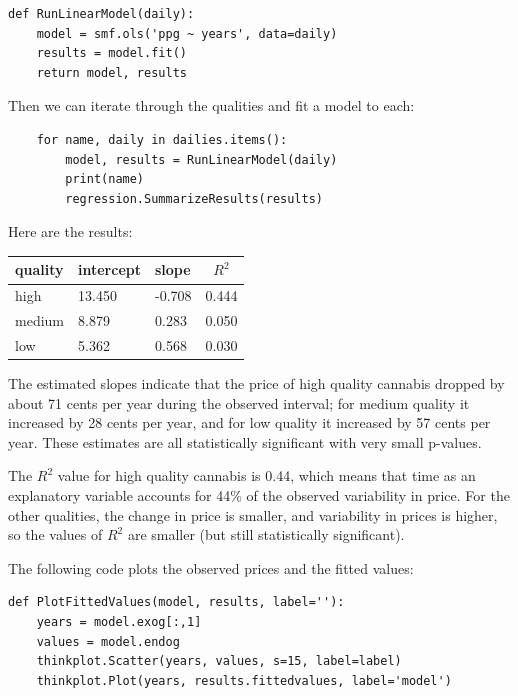\documentclass[12pt]{book}
\begin{document}
\begin{verbatim}
def RunLinearModel(daily):
    model = smf.ols('ppg ~ years', data=daily)
    results = model.fit()
    return model, results
\end{verbatim}

Then we can iterate through the qualities and fit a model to
each:

\begin{verbatim}
    for name, daily in dailies.items():
        model, results = RunLinearModel(daily)
        print(name)
        regression.SummarizeResults(results)
\end{verbatim}

Here are the results:

\begin{center}
\begin{tabular}{|l|l|l|c|} \hline
quality & intercept & slope & $R^2$ \\ \hline
high    & 13.450  & -0.708  & 0.444 \\
medium  &  8.879  & 0.283   & 0.050 \\
low     &  5.362  & 0.568   & 0.030 \\
\hline
\end{tabular}
\end{center}

The estimated slopes indicate that the price of high quality cannabis
dropped by about 71 cents per year during the observed interval; for
medium quality it increased by 28 cents per year, and for low quality
it increased by 57 cents per year.  These estimates are all
statistically significant with very small p-values.
   

The $R^2$ value for high quality cannabis is 0.44, which means
that time as an explanatory variable accounts for 44\% of the observed
variability in price.  For the other qualities, the change in price
is smaller, and variability in prices is higher, so the values
of $R^2$ are smaller (but still statistically significant).
   

The following code plots the observed prices and the fitted values:

\begin{verbatim}
def PlotFittedValues(model, results, label=''):
    years = model.exog[:,1]
    values = model.endog
    thinkplot.Scatter(years, values, s=15, label=label)
    thinkplot.Plot(years, results.fittedvalues, label='model')
\end{verbatim}
\end{document}
